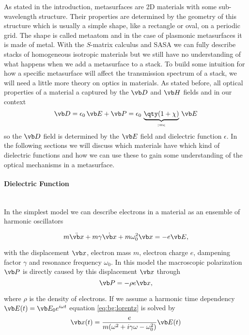 As stated in the introduction, metasurfaces are 2D materials with some sub-wavelength structure. Their properties are determined by the geometry of this structure which is usually a simple shape, like a rectangle or oval, on a periodic grid. The shape is called metaatom and in the case of plasmonic metasurfaces it is made of metal.
With the $S$-matrix calculus and SASA we can fully describe stacks of homogeneous isotropic materials but we still have no understanding of what happens when we add a metasurface to a stack. To build some intuition for how a specific metasurface will affect the transmission spectrum of a stack, we will need a little more theory on optics in materials. As stated before, all optical properties of a material a captured by the $\vb D$ and $\vb H$ fields and in our context
\begin{equation} \label{eq:bg:D}
    \vb D = 
    \epsilon_0 \, \vb E + \vb P =
    \epsilon_0\, \underbrace{\qty(1 + \chi)}_{
         := \epsilon
    }\, \vb E
\end{equation}
so the $\vb D$ field is determined by the $\vb E$ field and dielectric function $\epsilon$. In the following sections we will discuss which materials have which kind of dielectric functions and how we can use these to gain some understanding of the optical mechanisms in a metasurface.

\paragraph{Dielectric Function}~\\
In the simplest model we can describe electrons in a material as an ensemble of harmonic oscillators

\begin{equation} \label{eq:bg:lorentz}
    m \ddot{\vb x} + m \gamma \dot{\vb x} + m \omega_0^2 \vb x = -e \vb E,
\end{equation}

with the displacement $\vb x$, electron mass $m$, electron charge $e$, dampening factor $\gamma$ and resonance frequency $\omega_0$.
In this model the macroscopic polarization $\vb P$ is directly caused by this displacement $\vb x$ through
\begin{equation} \label{eq:bg:P}
    \vb P = - \rho e \vb x,
\end{equation}

where $\rho$ is the density of electrons.
If we assume a harmonic time dependency $\vb E(t) = \vb E_0 e^{i \omega t}$ equation \eqref{eq:bg:lorentz} is solved by 
\begin{equation}
    \vb x(t) = \frac{e}{m(\omega^2 + i \gamma \omega - \omega_0^2)} \vb E(t)
\end{equation}

